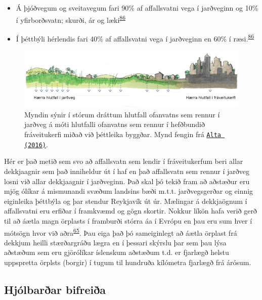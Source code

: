 \documentclass[icelandic,]{book}
\providecommand{\tightlist}{%
  \setlength{\itemsep}{0pt}\setlength{\parskip}{0pt}}
\begin{document}
\begin{itemize}
\tightlist
\item
  Á þjóðvegum og sveitavegum fari 90\% af affallsvatni vega í jarðveginn og 10\% í yfirborðsvatn; skurði, ár og læki\textsuperscript{\protect\hyperlink{ref-Verschoor2016}{86}}
\item
  Í þéttbýli hérlendis fari 40\% af affallsvatni vega í jarðveginn en 60\% í ræsi.\textsuperscript{\protect\hyperlink{ref-Verschoor2016}{86}}
\end{itemize}

\begin{figure}[H]

{\centering \includegraphics[width=1\linewidth]{myndir/ALTA} 

}

\caption{Myndin sýnir í stórum dráttum hlutfall ofanvatns sem rennur í jarðveg á móti hlutfalli ofanvatns sem rennur í hefðbundið fráveitukerfi miðað við þéttleika byggðar. Mynd fengin frá \href{http://www.skipulag.is/media/attachments/blagraenar_ofanvatnslausnir.pdf}{\nolinkurl{Alta (2016)}}.}\label{fig:ALTA}
\end{figure}

Hér er það metið sem svo að affallsvatn sem lendir í fráveitukerfum beri allar dekkjaagnir sem það inniheldur út í haf en það affallsvatn sem rennur í jarðveg losni við allar dekkjaagnir í jarðveginn. Það skal þó tekið fram að aðstæður eru mjög ólíkar á mismunandi svæðum landsins bæði m.t.t. jarðvegsgerðar og einnig eiginleika þéttbýla og þar stendur Reykjavík út úr. Mælingar á dekkjaögnum í affallsvatni eru erfiðar í framkvæmd og gögn skortir. Nokkur líkön hafa verið gerð til að áætla magn örplasts í framburði stórra áa í Evrópu en þau eru sum hver í mótsögn hvor við aðra\textsuperscript{\protect\hyperlink{ref-unice2019characterizing1}{65}}. Þau eiga það þó sameiginlegt að áætla örplast frá dekkjum heilli stærðargráðu lægra en í þessari skýrslu þar sem þau lýsa aðstæðum sem eru gjörólíkar íslenskum aðstæðum t.d. er fjarlægð helstu uppspretta örplsts (borgir) í tugum til hundruða kílómetra fjarlægð frá árósum.

\hypertarget{hjolbarar-bifreia}{%
\subsection*{Hjólbarðar bifreiða}\label{hjolbarar-bifreia}}
\end{document}
